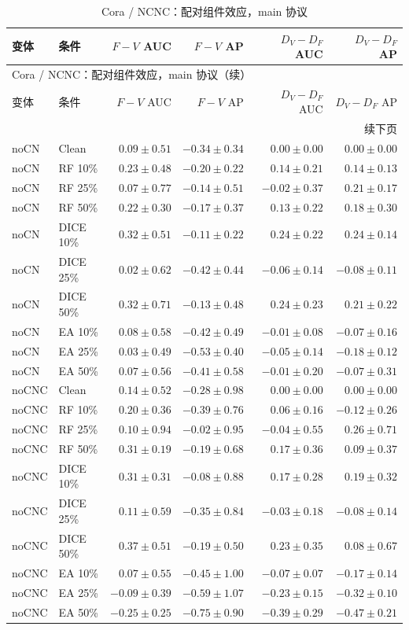 {\footnotesize
\setlength{\tabcolsep}{3.2pt}
\renewcommand{\arraystretch}{1.10}
\begin{longtable}{llrrrr}
\caption{Cora / NCNC：配对组件效应，main 协议}\\
\toprule
变体 & 条件 & $F-V$ AUC & $F-V$ AP & $D_V-D_F$ AUC & $D_V-D_F$ AP \\
\midrule
\endfirsthead
\multicolumn{6}{l}{Cora / NCNC：配对组件效应，main 协议（续）}\\
\toprule
变体 & 条件 & $F-V$ AUC & $F-V$ AP & $D_V-D_F$ AUC & $D_V-D_F$ AP \\
\midrule
\endhead
\midrule\multicolumn{6}{r}{续下页}\\
\endfoot
\bottomrule
\endlastfoot
noCN & Clean & $0.09\pm0.51$ & $-0.34\pm0.34$ & $0.00\pm0.00$ & $0.00\pm0.00$ \\
noCN & RF 10\% & $0.23\pm0.48$ & $-0.20\pm0.22$ & $0.14\pm0.21$ & $0.14\pm0.13$ \\
noCN & RF 25\% & $0.07\pm0.77$ & $-0.14\pm0.51$ & $-0.02\pm0.37$ & $0.21\pm0.17$ \\
noCN & RF 50\% & $0.22\pm0.30$ & $-0.17\pm0.37$ & $0.13\pm0.22$ & $0.18\pm0.30$ \\
noCN & DICE 10\% & $0.32\pm0.51$ & $-0.11\pm0.22$ & $0.24\pm0.22$ & $0.24\pm0.14$ \\
noCN & DICE 25\% & $0.02\pm0.62$ & $-0.42\pm0.44$ & $-0.06\pm0.14$ & $-0.08\pm0.11$ \\
noCN & DICE 50\% & $0.32\pm0.71$ & $-0.13\pm0.48$ & $0.24\pm0.23$ & $0.21\pm0.22$ \\
noCN & EA 10\% & $0.08\pm0.58$ & $-0.42\pm0.49$ & $-0.01\pm0.08$ & $-0.07\pm0.16$ \\
noCN & EA 25\% & $0.03\pm0.49$ & $-0.53\pm0.40$ & $-0.05\pm0.14$ & $-0.18\pm0.12$ \\
noCN & EA 50\% & $0.07\pm0.56$ & $-0.41\pm0.58$ & $-0.01\pm0.20$ & $-0.07\pm0.31$ \\
noCNC & Clean & $0.14\pm0.52$ & $-0.28\pm0.98$ & $0.00\pm0.00$ & $0.00\pm0.00$ \\
noCNC & RF 10\% & $0.20\pm0.36$ & $-0.39\pm0.76$ & $0.06\pm0.16$ & $-0.12\pm0.26$ \\
noCNC & RF 25\% & $0.10\pm0.94$ & $-0.02\pm0.95$ & $-0.04\pm0.55$ & $0.26\pm0.71$ \\
noCNC & RF 50\% & $0.31\pm0.19$ & $-0.19\pm0.68$ & $0.17\pm0.36$ & $0.09\pm0.37$ \\
noCNC & DICE 10\% & $0.31\pm0.31$ & $-0.08\pm0.88$ & $0.17\pm0.28$ & $0.19\pm0.32$ \\
noCNC & DICE 25\% & $0.11\pm0.59$ & $-0.35\pm0.84$ & $-0.03\pm0.18$ & $-0.08\pm0.14$ \\
noCNC & DICE 50\% & $0.37\pm0.51$ & $-0.19\pm0.50$ & $0.23\pm0.35$ & $0.08\pm0.67$ \\
noCNC & EA 10\% & $0.07\pm0.55$ & $-0.45\pm1.00$ & $-0.07\pm0.07$ & $-0.17\pm0.14$ \\
noCNC & EA 25\% & $-0.09\pm0.39$ & $-0.59\pm1.07$ & $-0.23\pm0.15$ & $-0.32\pm0.10$ \\
noCNC & EA 50\% & $-0.25\pm0.25$ & $-0.75\pm0.90$ & $-0.39\pm0.29$ & $-0.47\pm0.21$ \\
\end{longtable}
}

